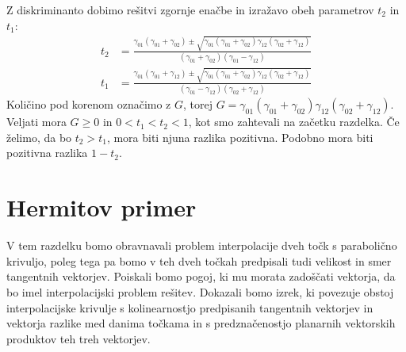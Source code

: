 \documentclass[mat1]{fmfdelo}
\begin{document}
%
Z diskriminanto dobimo rešitvi zgornje enačbe in izražavo obeh parametrov $t_2$ in $t_1$:
%
\begin{align*}
t_2 &= \frac{\gamma_{01}(\gamma_{01} + \gamma_{02}) \pm \sqrt{\gamma_{01} (\gamma_{01} + \gamma_{02}) \gamma_{12} (\gamma_{02} + \gamma_{12})} }
{(\gamma_{01} + \gamma_{02}) ( \gamma_{01} - \gamma_{12})} \\
t_1  &= \frac{\gamma_{01}(\gamma_{01} + \gamma_{12}) \pm \sqrt{\gamma_{01} (\gamma_{01} + \gamma_{02}) \gamma_{12} (\gamma_{02} + \gamma_{12})} }
{(\gamma_{01} - \gamma_{12}) ( \gamma_{02} + \gamma_{12})}
\end{align*}
%
Količino pod korenom označimo z $G$, torej $G = \gamma_{01} (\gamma_{01} + \gamma_{02}) \gamma_{12} (\gamma_{02} + \gamma_{12})$. Veljati mora $G \geq 0$ in $0<t_1<t_2<1$, kot smo zahtevali na začetku razdelka. Če želimo, da bo $t_2 > t_1$, mora biti njuna razlika pozitivna. Podobno mora biti pozitivna razlika $1 - t_2$.



\section{Hermitov primer}
%
V tem razdelku bomo obravnavali problem interpolacije dveh točk s parabolično krivuljo, poleg tega pa bomo v teh dveh točkah predpisali tudi velikost in smer tangentnih vektorjev. Poiskali bomo pogoj, ki mu morata zadoščati vektorja, da bo imel interpolacijski problem rešitev. Dokazali bomo izrek, ki povezuje obstoj interpolacijske krivulje s kolinearnostjo predpisanih tangentnih vektorjev in vektorja razlike med danima točkama in s predznačenostjo planarnih vektorskih produktov teh treh vektorjev.
\end{document}
